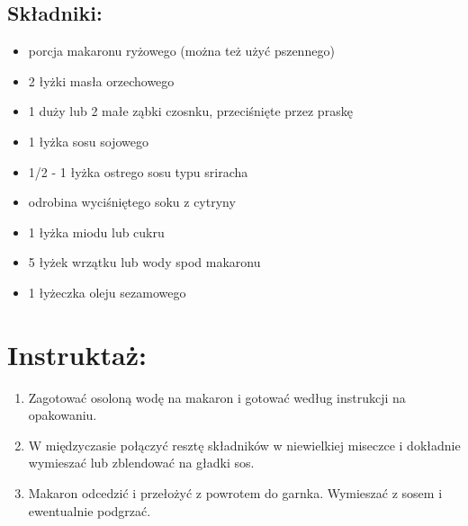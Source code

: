\documentclass[a4paper,10pt]{book}
\begin{document}
\begin{multicols}{2}

\section*{Składniki:} 
\begin{itemize} 
\item porcja makaronu ryżowego (można też użyć pszennego) 
\item 2 łyżki masła orzechowego 
\item 1 duży lub 2 małe ząbki czosnku, przeciśnięte przez praskę 
\item 1 łyżka sosu sojowego 
\item 1/2 - 1 łyżka ostrego sosu typu sriracha 
\item odrobina wyciśniętego soku z cytryny 
\item 1 łyżka miodu lub cukru 
\item 5 łyżek wrzątku lub wody spod makaronu
\item 1 łyżeczka oleju sezamowego 
\end{itemize}

\columnbreak

\begin{figure}[H] \centering 
\end{figure}

\end{multicols}

\vspace{0.5cm}

\section*{Instruktaż:} 
\begin{enumerate} 
\item Zagotować osoloną wodę na makaron i gotować według instrukcji na opakowaniu.
\item W międzyczasie połączyć resztę składników w niewielkiej miseczce i dokładnie wymieszać lub zblendować na gładki sos. 
\item Makaron odcedzić i przełożyć z powrotem do garnka. Wymieszać z sosem i ewentualnie podgrzać. 
\end{enumerate}
\end{document}
